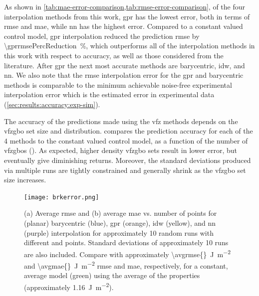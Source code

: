 \documentclass[final,twocolumn,12pt]{elsarticle}
\begin{document}
As shown in \cref{tab:mae-error-comparison,tab:rmse-error-comparison}, of the four interpolation methods from this work, \Gls{gpr} has the lowest error, both in terms of \gls{rmse} and \gls{mae}, while \gls{nn} has the highest error. Compared to a constant valued control model, \gls{gpr} interpolation reduced the prediction \gls{rmse} by \SI{\gprrmsePercReduction}{\percent}, which outperforms all of the interpolation methods in this work with respect to accuracy, as well as those considered from the literature. After \gls{gpr} the next most accurate methods are barycentric,
\gls{idw}, and \gls{nn}.
We also note that the \gls{rmse} interpolation error for the \gls{gpr} and barycentric methods is comparable to the minimum achievable noise-free experimental interpolation error which is the estimated error in experimental data (\cref{sec:results:accuracy:exp-sim}). %

The accuracy of the predictions made using the \gls{vfz} methods depends on the \gls{vfzgbo} set size and distribution. %
 compares the prediction accuracy for each of the 4 methods to the constant valued control model, as a function of the number of \inpt{} \glspl{vfzgbo} (). As expected, higher density \gls{vfzgbo} sets result in lower error, but eventually give diminishing returns. Moreover, the standard deviations produced via multiple runs are tightly constrained and generally shrink as the \gls{vfzgbo} set size increases. 
\begin{figure}
    \centering
    \texttt{[image: brkerror.png]}
    \caption{(a) Average \gls{rmse} and (b) average \gls{mae} vs. number of \inpt{} points for (planar) barycentric (blue), \gls{gpr} (orange), \gls{idw} (yellow), and \gls{nn} (purple) interpolation for approximately 10 random runs with different \inpt{} and \outpt{} points. Standard deviations of approximately 10 runs are also included. Compare with approximately \SI{\avgrmse{}}{\J\per\square\meter} and \SI{\avgmae{}}{\J\per\square\meter} \gls{rmse} and \gls{mae}, respectively, for a constant, average model (green) using the average of the \inpt{} properties (approximately \SI{1.16}{\J\per\square\meter}).}
    \label{fig:brkerror}
\end{figure}
\end{document}
